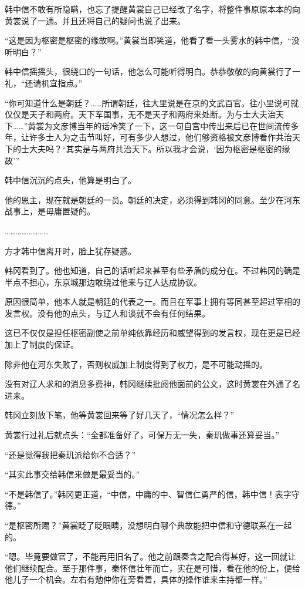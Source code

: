 韩中信不敢有所隐瞒，也忘了提醒黄裳自己已经改了名字，将整件事原原本本的向黄裳说了一通。并且还将自己的疑问也说了出来。

“这是因为枢密是枢密的缘故啊。”黄裳当即笑道，他看了看一头雾水的韩中信，“没听明白？”

韩中信摇摇头，很绕口的一句话，他怎么可能听得明白。恭恭敬敬的向黄裳行了一礼，“还请机宜指点。”

“你可知道什么是朝廷？……所谓朝廷，往大里说是在京的文武百官。往小里说可就仅仅是天子和两府。天下军国事，无不是天子和两府来处断。为与士大夫治天下……”黄裳为文彦博当年的话冷笑了一下，这一句自宫中传出来后已在世间流传多年，让许多士人为之击节叫好，可有多少人想过，他们够资格被文彦博看作共治天下的士大夫吗？“其实是与两府共治天下。所以我才会说，‘因为枢密是枢密的缘故’”

韩中信沉沉的点头，他算是明白了。

他的恩主，现在就是朝廷的一员。朝廷的决定，必须得到韩冈的同意。至少在河东战事上，是毋庸置疑的。

……………………

方才韩中信离开时，脸上犹存疑惑。

韩冈看到了。他也知道，自己的话听起来甚至有些矛盾的成分在。不过韩冈的确是半点不担心，东京城那边敢绕过他来与辽人达成协议。

原因很简单，他本人就是朝廷的代表之一。而且在军事上拥有等同甚至超过宰相的发言权。没有他的点头，与辽人和谈就不会有任何结果。

这已不仅仅是担任枢密副使之前单纯依靠经历和威望得到的发言权，现在更是已经加上了制度的保证。

除非他在河东失败了，否则权威加上制度得到了权力，是不可能动摇的。

没有对辽人求和的消息多费神，韩冈继续批阅他面前的公文，这时黄裳在外通了名进来。

韩冈立刻放下笔，他等黄裳回来等了好几天了，“情况怎么样？”

黄裳行过礼后就点头：“全都准备好了，可保万无一失，秦玑做事还算妥当。”

“还是觉得我把秦玑派给你不合适？”

“其实此事交给韩信来做是最妥当的。”

“不是韩信了。”韩冈更正道，“中信，中庸的中、智信仁勇严的信，韩中信！表字守德。”

“是枢密所赐？”黄裳眨了眨眼睛，没想明白哪个典故能把中信和守德联系在一起的。

“嗯。毕竟要做官了，不能再用旧名了。他之前跟秦含之配合得甚好，这一回就让他们继续配合。至于那件事，秦怀信壮年而亡，实在是可惜，看在他的份上，便给他儿子一个机会。左右有勉仲你在旁看着，具体的操作谁来主持都一样。”

